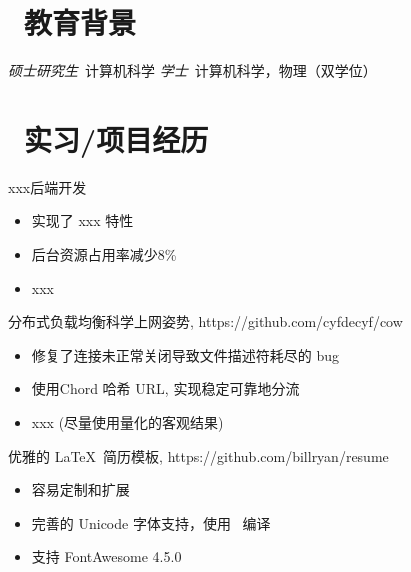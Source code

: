 \documentclass{resume}
\begin{document}


 
\section{\faGraduationCap\  教育背景}
\textit{硕士研究生}\ 计算机科学
\textit{学士}\ 计算机科学，物理（双学位）

\section{\faUsers\ 实习/项目经历}
\role{软件开发工程师}{工作经历}
xxx后端开发
\begin{itemize}
  \item 实现了 xxx 特性
  \item 后台资源占用率减少8\%
  \item xxx
\end{itemize}

\begin{onehalfspacing}
分布式负载均衡科学上网姿势, https://github.com/cyfdecyf/cow
\begin{itemize}
  \item 修复了连接未正常关闭导致文件描述符耗尽的 bug
  \item 使用Chord 哈希 URL, 实现稳定可靠地分流
  \item xxx (尽量使用量化的客观结果)
\end{itemize}
\end{onehalfspacing}

\begin{onehalfspacing}
优雅的 \LaTeX\ 简历模板, https://github.com/billryan/resume
\begin{itemize}
  \item 容易定制和扩展
  \item 完善的 Unicode 字体支持，使用 \XeLaTeX\ 编译
  \item 支持 FontAwesome 4.5.0
\end{itemize}
\end{onehalfspacing}
\end{document}
